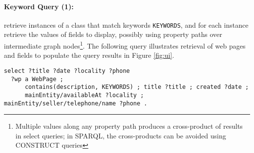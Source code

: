 \paragraph{Keyword Query (1):} 
retrieve instances of a class that match keywords \verb|KEYWORDS|, and for each instance retrieve the values of fields to display, possibly using property paths over intermediate graph nodes\footnote{Multiple values along any property path produces a cross-product of results in select queries; in SPARQL, the cross-products can be avoided using  CONSTRUCT queries}.
The following query illustrates retrieval of web pages and fields to populate the query results in Figure \ref{fig:ui}.
{\footnotesize
\begin{verbatim}
select ?title ?date ?locality ?phone
  ?wp a WebPage ; 
      contains(description, KEYWORDS) ; title ?title ; created ?date ;
      mainEntity/availableAt ?locality ; mainEntity/seller/telephone/name ?phone .
\end{verbatim}}


